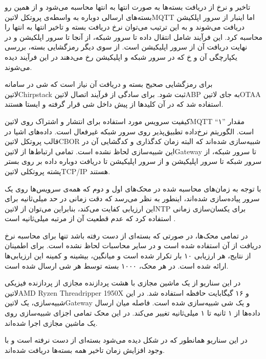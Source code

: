 تاخیر و نرخ از دریافت بسته‌ها به صورت انتها به انتها محاسبه می‌شود و از همین رو بسته‌های ارسالی دوباره به واسطه‌ی پروتکل ‌لاتین{MQTT} اما اینبار از سرور اپلکیشن
دریافت می‌شوند و به این ترتیب می‌توان نرخ دریافت بسته و تاخیر انتها به انتها را محاسبه کرد. این فرآیند شامل انتقال داده تا سرور شبکه، از آنجا تا سرور اپلکیشن و در نهایت
دریافت آن از سرور اپلیکیشن است. از سوی دیگر رمزگشایی بسته، بررسی یکپارچگی آن و ‌خ که در سرور شبکه و اپلیکیشن رخ می‌دهند در این فرآیند دیده می‌شوند.

برای رمزگشایی صحیح بسته و دریافت آن نیاز است
که شی در سامانه ‌لاتین{Chirpstack} ثبت شود. برای سادگی از فرآیند اتصال ‌لاتین{ABP} به جای ‌لاتین{OTAA} استفاده شد که در آن کلیدها از پیش
داخل شی قرار گرفته و ایستا هستند.

کیفیت سرویس مورد استفاده برای انتشار و اشتراک روی ‌لاتین{MQTT} مقدار ''۱`` است. الگوریتم نرخ‌داده تطبیق‌پذیر روی سرور شبکه غیرفعال است.
داده‌های اشیا در قالب پروتکل ‌لاتین{CBOR} شبیه‌سازی شده‌اند که البته زمان کدگذاری و کدگشایی آن در این شبیه‌سازی لحاظ نشده است.
تمامی ارتباط‌ها از ‌لاتین{Gateway} تا سرور شبکه، از سرور شبکه تا سرور اپلیکیشن و از سرور اپلیکیشن تا دریافت دوباره داده
بر روی بستر پشته پروتکلی ‌لاتین{TCP/IP} هستند.

با توجه به زمان‌های محاسبه شده در محک‌های اول و دوم که همه‌ی سرویس‌ها روی یک سرور پیاده‌سازی شده‌اند، اینطور به نظر می‌رسد که دقت زمانی در حد میلی‌ثانیه
برای این ارزیابی کفایت می‌کند، بنابراین می‌توان از ‌لاتین{NTP} برای یکسان‌سازی زمانی استفاده کرد که عدم قطعیت آن از مرتبه میلی‌ثانیه است .

در تمامی محک‌ها، در صورتی که بسته‌ای از دست رفته باشد تنها برای محاسبه نرخ دریافت از آن استفاده شده است و در سایر محاسبات لحاظ نشده است.
برای اطمینان از نتایج، هر ارزیابی ۱۰ بار تکرار شده است و میانگین، بیشینه و کمینه این ارزیابی‌ها ارائه شده است. در هر محک، ۱۰۰۰ بسته توسط هر شی ارسال شده است.


در این سناریو از یک ماشین مجازی با هشت پردازنده مجازی از پردازنده فیزیکی
‌لاتین{AMD Ryzen Threadripper 1950X}
و ۱۶ گیگابایت حافظه استفاده شد.
در این شبیه‌سازی، یک ‌لاتین{Gateway} و یک شی شبیه‌سازی شده است. فاصله میان ارسال داده‌ها از ۱ ثانیه تا ۱ میلی‌ثانیه تغییر می‌کند.
در این محک تمامی اجزای شبیه‌سازی روی یک ماشین مجازی اجرا شده‌اند.

در این سناریو همانطور که در شکل 
دیده می‌شود بسته‌ای از دست نرفته است و با وجود افزایش زمان تاخیر همه بسته‌ها دریافت شده‌اند.

